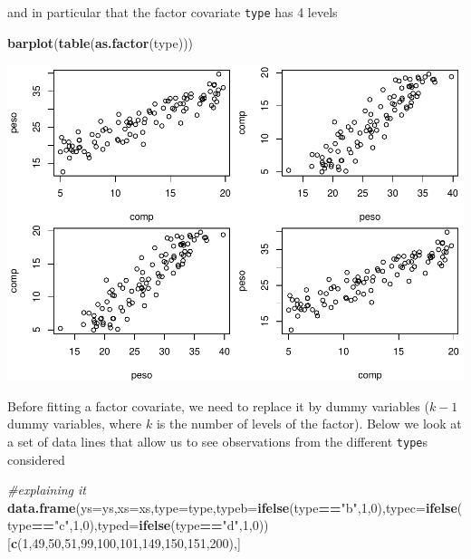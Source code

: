 \documentclass[
]{book}
\newenvironment{Shaded}{\begin{snugshade}}{\end{snugshade}}
\newcommand{\CommentTok}[1]{\textcolor[rgb]{0.56,0.35,0.01}{\textit{#1}}}
\newcommand{\DataTypeTok}[1]{\textcolor[rgb]{0.13,0.29,0.53}{#1}}
\newcommand{\DecValTok}[1]{\textcolor[rgb]{0.00,0.00,0.81}{#1}}
\newcommand{\KeywordTok}[1]{\textcolor[rgb]{0.13,0.29,0.53}{\textbf{#1}}}
\newcommand{\NormalTok}[1]{#1}
\newcommand{\OperatorTok}[1]{\textcolor[rgb]{0.81,0.36,0.00}{\textbf{#1}}}
\newcommand{\StringTok}[1]{\textcolor[rgb]{0.31,0.60,0.02}{#1}}
\begin{document}
and in particular that the factor covariate \texttt{type} has 4 levels

\begin{Shaded}
\begin{Highlighting}[]
\KeywordTok{barplot}\NormalTok{(}\KeywordTok{table}\NormalTok{(}\KeywordTok{as.factor}\NormalTok{(type)))}
\end{Highlighting}
\end{Shaded}

\includegraphics{ECOMODbook_files/figure-latex/unnamed-chunk-1-1.pdf}

Before fitting a factor covariate, we need to replace it by dummy variables (\(k-1\) dummy variables, where \(k\) is the number of levels of the factor). Below we look at a set of data lines that allow us to see observations from the different \texttt{type}s considered

\begin{Shaded}
\begin{Highlighting}[]
\CommentTok{#explaining it}
\KeywordTok{data.frame}\NormalTok{(}\DataTypeTok{ys=}\NormalTok{ys,}\DataTypeTok{xs=}\NormalTok{xs,}\DataTypeTok{type=}\NormalTok{type,}\DataTypeTok{typeb=}\KeywordTok{ifelse}\NormalTok{(type}\OperatorTok{==}\StringTok{"b"}\NormalTok{,}\DecValTok{1}\NormalTok{,}\DecValTok{0}\NormalTok{),}\DataTypeTok{typec=}\KeywordTok{ifelse}\NormalTok{(type}\OperatorTok{==}\StringTok{"c"}\NormalTok{,}\DecValTok{1}\NormalTok{,}\DecValTok{0}\NormalTok{),}\DataTypeTok{typed=}\KeywordTok{ifelse}\NormalTok{(type}\OperatorTok{==}\StringTok{"d"}\NormalTok{,}\DecValTok{1}\NormalTok{,}\DecValTok{0}\NormalTok{))[}\KeywordTok{c}\NormalTok{(}\DecValTok{1}\NormalTok{,}\DecValTok{49}\NormalTok{,}\DecValTok{50}\NormalTok{,}\DecValTok{51}\NormalTok{,}\DecValTok{99}\NormalTok{,}\DecValTok{100}\NormalTok{,}\DecValTok{101}\NormalTok{,}\DecValTok{149}\NormalTok{,}\DecValTok{150}\NormalTok{,}\DecValTok{151}\NormalTok{,}\DecValTok{200}\NormalTok{),]}
\end{Highlighting}
\end{Shaded}
\end{document}
